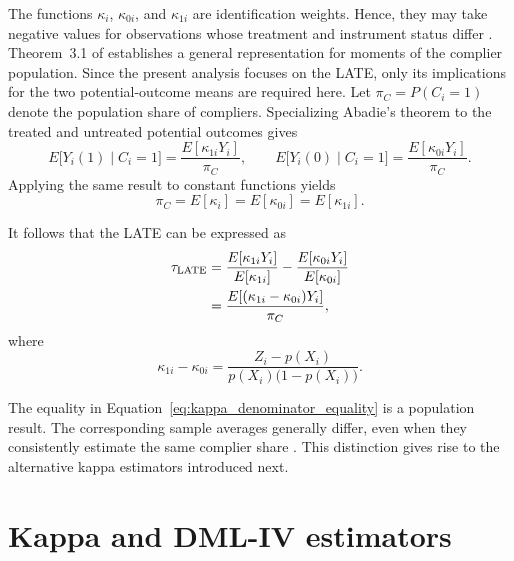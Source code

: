 \documentclass[12pt, a4paper, oneside]{article}
\theoremstyle{plain}
\theoremstyle{definition}
\begin{document}
The functions $\kappa_i$, $\kappa_{0i}$, and $\kappa_{1i}$ are identification weights. Hence, they may take negative values for observations whose treatment and instrument status differ \citep[p.~237]{abadie2003semiparametric}. Theorem~3.1 of \citet{abadie2003semiparametric} establishes a general representation for moments of the complier population. Since the present analysis focuses on the LATE, only its implications for the two potential-outcome means are required here.
Let
    $\pi_C=P(C_i=1)$
denote the population share of compliers. Specializing Abadie's theorem to the treated and untreated potential outcomes gives
\begin{equation}
    E\bigl[Y_i(1)\mid C_i=1\bigr]
    =
    \frac{E[\kappa_{1i}Y_i]}{\pi_C},
    \qquad
    E\bigl[Y_i(0)\mid C_i=1\bigr]
    =
    \frac{E[\kappa_{0i}Y_i]}{\pi_C}.
    \label{eq:kappa_potential_outcome_means}
\end{equation}
Applying the same result to constant functions yields
\begin{equation}
    \pi_C
    =
    E[\kappa_i]
    =
    E[\kappa_{0i}]
    =
    E[\kappa_{1i}].
    \label{eq:kappa_denominator_equality}
\end{equation}

It follows that the LATE can be expressed as
\begin{align}
    \tau_{\mathrm{LATE}}
    &=
    \frac{E[\kappa_{1i}Y_i]}{E[\kappa_{1i}]}
    -
    \frac{E[\kappa_{0i}Y_i]}{E[\kappa_{0i}]} \notag\\
    &=
    \frac{E[(\kappa_{1i}-\kappa_{0i})Y_i]}{\pi_C},
    \label{eq:kappa_late_representation}
\end{align}
where
\begin{equation}
    \kappa_{1i}-\kappa_{0i}
    =
    \frac{Z_i-p(X_i)}
         {p(X_i)\bigl(1-p(X_i)\bigr)}.
    \label{eq:kappa_outcome_contrast}
\end{equation}

The equality in Equation~\eqref{eq:kappa_denominator_equality} is a population result. The corresponding sample averages generally differ, even when they consistently estimate the same complier share \citep[Remark~2.2]{sloczynski2025abadie}. This distinction gives rise to the alternative kappa estimators introduced next.

\section{Kappa and DML-IV estimators}
\end{document}
